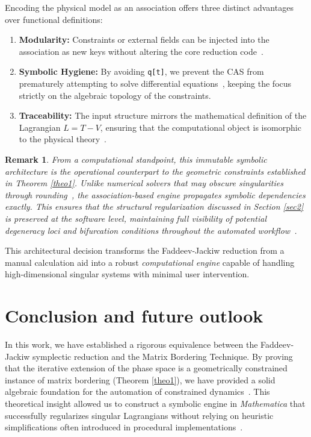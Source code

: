 \documentclass[11pt,a4paper]{article}
\newtheorem{remark}{Remark}
\begin{document}
Encoding the physical model as an association offers three distinct advantages over functional definitions:
\begin{enumerate}
	\item \textbf{Modularity:} Constraints or external fields can be injected into the association as new keys without altering the core reduction code~\cite{Wolfram2002}.
	\item \textbf{Symbolic Hygiene:} By avoiding \texttt{q[t]}, we prevent the CAS from prematurely attempting to solve differential equations~\cite{Geddes1992,Fateman1991}, keeping the focus strictly on the algebraic topology of the constraints.
	\item \textbf{Traceability:} The input structure mirrors the mathematical definition of the Lagrangian $L = T - V$, ensuring that the computational object is isomorphic to the physical theory~\cite{ArnoldBook,Goldstein2002}.
\end{enumerate}

\begin{remark} From a computational standpoint, this immutable symbolic architecture is the operational counterpart to the geometric constraints established in Theorem \ref{theo1}. Unlike numerical solvers that may obscure singularities through rounding~\cite{Higham2002,Trefethen1997}, the association-based engine propagates symbolic dependencies exactly. This ensures that the structural regularization discussed in Section \ref{sec2} is preserved at the software level, maintaining full visibility of potential degeneracy loci and bifurcation conditions throughout the automated workflow~\cite{Kuznetsov2004,Seydel2010}. \end{remark}


This architectural decision transforms the Faddeev-Jackiw reduction from a manual calculation aid into a robust \textit{computational engine} capable of handling high-dimensional singular systems with minimal user intervention.


\section{Conclusion and future outlook}\label{6}


In this work, we have established a rigorous equivalence between the Faddeev-Jackiw symplectic reduction and the Matrix Bordering Technique. By proving that the iterative extension of the phase space is a geometrically constrained instance of matrix bordering (Theorem \ref{theo1}), we have provided a solid algebraic foundation for the automation of constrained dynamics~\cite{GolubVanLoan2013,Galantai2001}. This theoretical insight allowed us to construct a symbolic engine in \textit{Mathematica} that successfully regularizes singular Lagrangians without relying on heuristic simplifications often introduced in procedural implementations~\cite{Wolfram2002,Geddes1992}.
\end{document}
